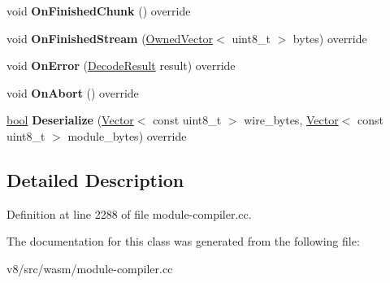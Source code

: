\begin{DoxyCompactItemize}
\item 
\mbox{\label{classv8_1_1internal_1_1wasm_1_1AsyncStreamingProcessor_a19842d57ed6e47f88fc3ccb57cd43619}} 
void {\bfseries On\+Finished\+Chunk} () override
\item 
\mbox{\label{classv8_1_1internal_1_1wasm_1_1AsyncStreamingProcessor_a71228a56974b4732b934cef2f41f5b38}} 
void {\bfseries On\+Finished\+Stream} (\mbox{\hyperlink{classv8_1_1internal_1_1OwnedVector}{Owned\+Vector}}$<$ uint8\+\_\+t $>$ bytes) override
\item 
\mbox{\label{classv8_1_1internal_1_1wasm_1_1AsyncStreamingProcessor_a93f061ce296025f77c649165727788e1}} 
void {\bfseries On\+Error} (\mbox{\hyperlink{classv8_1_1internal_1_1wasm_1_1Result}{Decode\+Result}} result) override
\item 
\mbox{\label{classv8_1_1internal_1_1wasm_1_1AsyncStreamingProcessor_a807224ecf5ba4eaf8434dea9b99a78a8}} 
void {\bfseries On\+Abort} () override
\item 
\mbox{\label{classv8_1_1internal_1_1wasm_1_1AsyncStreamingProcessor_a3b341c705984fdf54fa5e4be1ac5f135}} 
\mbox{\hyperlink{classbool}{bool}} {\bfseries Deserialize} (\mbox{\hyperlink{classv8_1_1internal_1_1Vector}{Vector}}$<$ const uint8\+\_\+t $>$ wire\+\_\+bytes, \mbox{\hyperlink{classv8_1_1internal_1_1Vector}{Vector}}$<$ const uint8\+\_\+t $>$ module\+\_\+bytes) override
\end{DoxyCompactItemize}


\subsection{Detailed Description}


Definition at line 2288 of file module-\/compiler.\+cc.



The documentation for this class was generated from the following file\+:\begin{DoxyCompactItemize}
\item 
v8/src/wasm/module-\/compiler.\+cc\end{DoxyCompactItemize}
